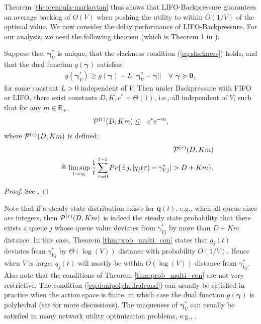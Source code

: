 \documentclass[journal]{IEEEtran}
\newcommand{\prob}{Pr}
\newcommand{\bv}[1]{{\boldsymbol{#1} }}
\newcommand{\script}[1]{{{\cal{#1} }}}
\begin{document}
Theorem \ref{theorem:qla-markovian} thus shows that LIFO-Backpressure guarantees an average backlog of $O(V)$ when pushing the utility to within $O(1/V)$ of the optimal value. 
We now consider the delay performance of LIFO-Backpressure. For our analysis, we need the following theorem (which is Theorem 1 in \cite{huangneely_dr_tac}).
\begin{thm}\label{thm:prob_multi_con}
Suppose that $\bv{\gamma}^*_V$ is unique,  that the slackness condition (\ref{eq:slackness}) holds, and that  the dual function $g(\bv{\gamma})$ satisfies:
\begin{eqnarray}
g(\bv{\gamma}^*_V)\geq g(\bv{\gamma})+L||\bv{\gamma}^*_V-\bv{\gamma}||\quad\forall\,\,\bv{\gamma}\succeq\bv{0}\label{eq:dualpolyhedralcond},
\end{eqnarray}
for some constant $L>0$ independent of $V$. Then under Backpressure with FIFO or LIFO, there exist constants $D, K, c^*=\Theta(1)$, i.e., all independent of $V$, such that for any $m\in \mathbb{R}_+$, 
\begin{eqnarray}
\script{P}^{(r)}(D, Km)&\leq& c^*e^{-m},\label{eq:prob_pmr_special}
\end{eqnarray}
where $\script{P}^{(r)}(D, Km)$ is defined:
\begin{eqnarray}
\hspace{-.3in}&&\script{P}^{(r)}(D, Km)\label{eq:pmr_def}\\
\hspace{-.3in}&&\qquad\quad\triangleq\limsup_{t\rightarrow\infty}\frac{1}{t}\sum_{\tau=0}^{t-1}\prob\{\exists\, j, |q_j(\tau)-\gamma_{Vj}^*|>D+Km\}.\nonumber
\end{eqnarray}
\end{thm}
\begin{proof}
See \cite{huangneely_dr_tac}. 
\end{proof}

Note that if a steady state distribution exists for $\bv{q}(t)$, e.g., when all queue sizes are integers, then $\script{P}^{(r)}(D, Km)$ is indeed the steady state probability that there exists a queue $j$ whose queue value deviates from $\gamma^*_{Vj}$ by more than $D+Km$ distance. In this case, Theorem \ref{thm:prob_multi_con} states that $q_j(t)$ deviates from $\gamma_{Vj}^*$ by $\Theta(\log(V))$ distance with probability $O(1/V)$. Hence when $V$ is large, $q_j(t)$ will mostly be within $O(\log(V))$ distance from $\gamma^*_{Vj}$. 
Also note that the conditions of Theorem  \ref{thm:prob_multi_con} are not very restrictive. The condition (\ref{eq:dualpolyhedralcond}) can usually be satisfied in practice when the action space is  finite, in which case the dual function $g(\bv{\gamma})$ is polyhedral (see  \cite{huangneely_dr_tac} for more discussions). The uniqueness of $\bv{\gamma}_V^*$ can usually be satisfied in many network utility optimization problems, e.g., \cite{eryilmaz_qbsc_ton07}. 
\end{document}
